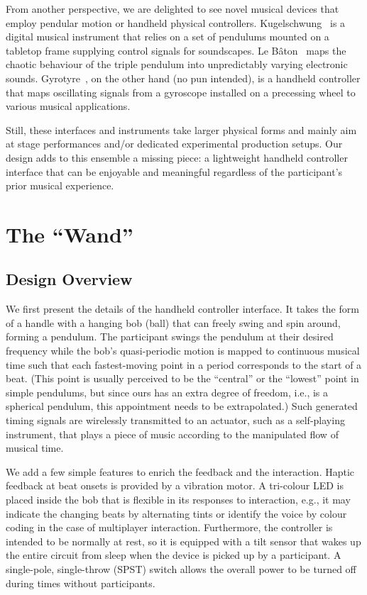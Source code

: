 \documentclass{nime-alternate} %
\begin{document}
From another perspective, we are delighted to see novel musical devices that employ pendular motion or handheld physical controllers. Kugelschwung~\cite{Kugelschwung} is a digital musical instrument that relies on a set of pendulums mounted on a tabletop frame supplying control signals for soundscapes. Le Bâton~\cite{LeBaton} maps the chaotic behaviour of the triple pendulum into unpredictably varying electronic sounds. Gyrotyre~\cite{Gyrotyre}, on the other hand (no pun intended), is a handheld controller that maps oscillating signals from a gyroscope installed on a precessing wheel to various musical applications.

Still, these interfaces and instruments take larger physical forms and mainly aim at stage performances and/or dedicated experimental production setups. Our design adds to this ensemble a missing piece: a lightweight handheld controller interface that can be enjoyable and meaningful regardless of the participant's prior musical experience.

\section{The ``Wand''}

\subsection{Design Overview}
We first present the details of the handheld controller interface. It takes the form of a handle with a hanging bob (ball) that can freely swing and spin around, forming a pendulum. The participant swings the pendulum at their desired frequency while the bob's quasi-periodic motion is mapped to continuous musical time such that each fastest-moving point in a period corresponds to the start of a beat. (This point is usually perceived to be the ``central'' or the ``lowest'' point in simple pendulums, but since ours has an extra degree of freedom, i.e., is a spherical pendulum, this appointment needs to be extrapolated.) Such generated timing signals are wirelessly transmitted to an actuator, such as a self-playing instrument, that plays a piece of music according to the manipulated flow of musical time.

We add a few simple features to enrich the feedback and the interaction. Haptic feedback at beat onsets is provided by a vibration motor. A tri-colour LED is placed inside the bob that is flexible in its responses to interaction, e.g., it may indicate the changing beats by alternating tints or identify the voice by colour coding in the case of multiplayer interaction. Furthermore, the controller is intended to be normally at rest, so it is equipped with a tilt sensor that wakes up the entire circuit from sleep when the device is picked up by a participant. A single-pole, single-throw (SPST) switch allows the overall power to be turned off during times without participants.
\end{document}
